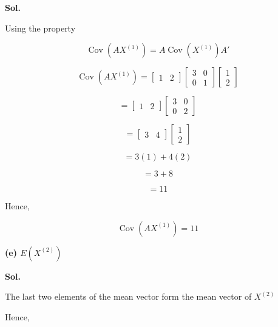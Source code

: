 \documentclass[12pt]{article}
\begin{document}
\noindent
\textbf{Sol.}

\vspace{0.3cm}

\noindent
Using the property

\[
\operatorname{Cov}(AX^{(1)})
=
A\operatorname{Cov}(X^{(1)})A'
\]

\[
\operatorname{Cov}(AX^{(1)})
=
\begin{bmatrix}
1 & 2
\end{bmatrix}
\begin{bmatrix}
3 & 0\\
0 & 1
\end{bmatrix}
\begin{bmatrix}
1\\
2
\end{bmatrix}
\]

\[
=
\begin{bmatrix}
1 & 2
\end{bmatrix}
\begin{bmatrix}
3 & 0\\
0 & 2
\end{bmatrix}
\]

\[
=
\begin{bmatrix}
3 & 4
\end{bmatrix}
\begin{bmatrix}
1\\
2
\end{bmatrix}
\]

\[
=
3(1)+4(2)
\]

\[
=
3+8
\]

\[
=
11
\]

\noindent
Hence,

\[
\boxed{
\operatorname{Cov}(AX^{(1)})=11
}
\]

\vspace{1cm}

\noindent
\textbf{(e) \(E(X^{(2)})\)}

\vspace{0.5cm}

\noindent
\textbf{Sol.}

\vspace{0.3cm}

\noindent
The last two elements of the mean vector form the mean vector of \(X^{(2)}\)

\vspace{0.3cm}

\noindent
Hence,

\vspace{0.3cm}
\end{document}

